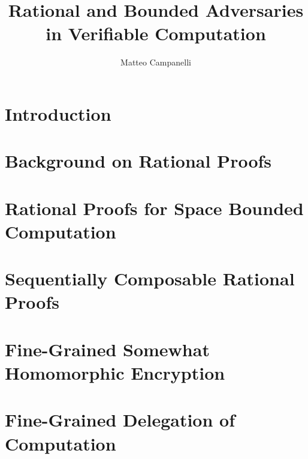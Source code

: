 \documentclass[12pt]{tufte-book}
\title{Rational and Bounded Adversaries in Verifiable Computation}
\author{Matteo Campanelli}
\date{}
\begin{document}
\maketitle


\tableofcontents





\chapter{Introduction}




\chapter{Background on Rational Proofs}




\chapter{Rational Proofs for Space Bounded Computation}




\chapter{Sequentially Composable Rational Proofs}



\chapter{Fine-Grained Somewhat Homomorphic Encryption}



\chapter{Fine-Grained Delegation of Computation}








\end{document}

